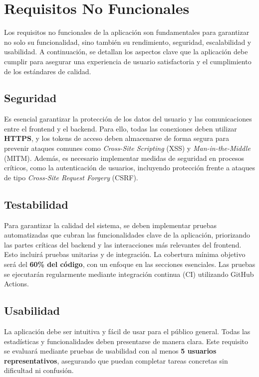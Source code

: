 \section{Requisitos No Funcionales}

Los requisitos no funcionales de la aplicación son fundamentales para garantizar no solo su funcionalidad, sino también su rendimiento, seguridad, escalabilidad y usabilidad. A continuación, se detallan los aspectos clave que la aplicación debe cumplir para asegurar una experiencia de usuario satisfactoria y el cumplimiento de los estándares de calidad.

\subsection*{Seguridad}

Es esencial garantizar la protección de los datos del usuario y las comunicaciones entre el frontend y el backend. Para ello, todas las conexiones deben utilizar \textbf{HTTPS}, y los tokens de acceso deben almacenarse de forma segura para prevenir ataques comunes como \textit{Cross-Site Scripting} (XSS) y \textit{Man-in-the-Middle} (MITM). Además, es necesario implementar medidas de seguridad en procesos críticos, como la autenticación de usuarios, incluyendo protección frente a ataques de tipo \textit{Cross-Site Request Forgery} (CSRF).

\subsection*{Testabilidad}

Para garantizar la calidad del sistema, se deben implementar pruebas automatizadas que cubran las funcionalidades clave de la aplicación, priorizando las partes críticas del backend y las interacciones más relevantes del frontend. Esto incluirá pruebas unitarias y de integración. La cobertura mínima objetivo será del \textbf{60\% del código}, con un enfoque en las secciones esenciales. Las pruebas se ejecutarán regularmente mediante integración continua (CI) utilizando GitHub Actions.

\subsection*{Usabilidad}

La aplicación debe ser intuitiva y fácil de usar para el público general. Todas las estadísticas y funcionalidades deben presentarse de manera clara. Este requisito se evaluará mediante pruebas de usabilidad con al menos \textbf{5 usuarios representativos}, asegurando que puedan completar tareas concretas sin dificultad ni confusión.


